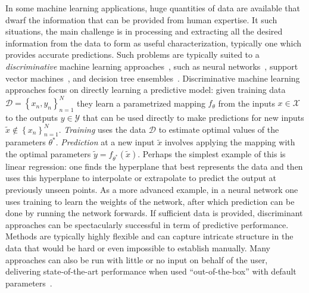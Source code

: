 In some machine learning applications, huge quantities of data are available that dwarf the information
that can be provided from human expertise.  It such situations, the main challenge is in processing
and extracting all the desired information from the data to form as useful characterization,
typically
one which provides accurate predictions.  Such problems are typically suited to a \emph{discriminative} 
machine learning approaches~\citep{breiman2001statistical}, such as neural
 networks~\citep{rumelhart1986learning,bishop1995neural}, 
support vector machines~\citep{cortes1995support,scholkopf2002learning}, and decision tree 
ensembles~\citep{breiman2001random,rainforth2015canonical}.  Discriminative machine learning approaches
focus on directly learning a predictive model: given training data $\mathcal{D} = \left\{x_n,y_n\right\}_{n=1}^N$
they learn a parametrized mapping $f_{\theta}$ from the inputs $x \in \mathcal{X}$ to the 
outputs $y\in\mathcal{Y}$ that can 
be used directly to make predictions 
for new inputs $\tilde{x} \notin \left\{x_n\right\}_{n=1}^N$.  \emph{Training}
uses the data $\mathcal{D}$ to estimate optimal values of the parameters $\theta^*$. \emph{Prediction}
at a new input $\tilde{x}$ involves applying the mapping with the optimal parameters
$\tilde{y} = f_{\theta^*}(\tilde{x})$.  Perhaps the simplest example of this is linear regression: one finds
the hyperplane that best represents the data and then uses this hyperplane to interpolate or extrapolate
to predict the output at previously unseen points.  
As a more advanced example, in a neural network one uses training to learn the
weights of the network, after which prediction can be done by running the network forwards.  If sufficient
data is provided, discriminant approaches can be spectacularly successful in term of predictive
performance.  Methods are typically highly flexible and can capture intricate structure in the data that
would be hard or even impossible to establish manually.  Many approaches can also be run with little
or no input on behalf of the user, delivering state-of-the-art performance when used
``out-of-the-box'' with default parameters~\citep{rainforth2015canonical}.

